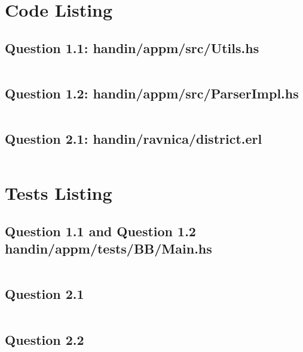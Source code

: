 \documentclass[11pt,a4paper]{article}
\begin{document}

\appendix
\section{Code Listing}
\subsection{Question 1.1: handin/appm/src/Utils.hs}
\label{appendix:question1-1}
\inputminted{haskell}{handin/appm/src/Utils.hs}
\subsection{Question 1.2: handin/appm/src/ParserImpl.hs}
\label{appendix:question1-2}
\inputminted{haskell}{handin/appm/src/ParserImpl.hs}
\subsection{Question 2.1: handin/ravnica/district.erl}
\inputminted{erlang}{handin/ravnica/district.erl}
\label{appendix:question2-1}

\section{Tests Listing}
\subsection{Question 1.1 and Question 1.2 handin/appm/tests/BB/Main.hs}
\inputminted{haskell}{handin/appm/tests/BB/Main.hs}
\subsection{Question 2.1}
\inputminted{erlang}{handin/ravnica/district_tests.erl}
\subsection{Question 2.2}
\inputminted{erlang}{handin/ravnica/district_qc.erl}
\label{appendix:tests}
\end{document}
